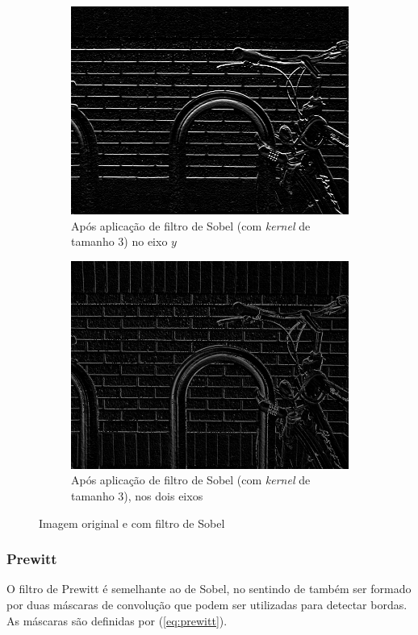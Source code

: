 \documentclass[10pt,a4paper]{article}
\newcommand{\kernel}{\textit{kernel} }
\begin{document}
\begin{figure}[!ht]
\begin{subfigure}[ht]{0.45\textwidth}
        \includegraphics[width=\textwidth]{sobel_y.jpg}
        \caption{\centering Após aplicação de filtro de Sobel (com \kernel de tamanho 3) no eixo $y$}
        \label{fig:sobel_y}
    \end{subfigure}
    \qquad
    \begin{subfigure}[ht]{0.45\textwidth}
        \includegraphics[width=\textwidth]{sobel.jpg}
        \caption{\centering Após aplicação de filtro de Sobel (com \kernel de tamanho 3), nos dois eixos}
        \label{fig:sobel}
    \end{subfigure}
    \caption{Imagem original e com filtro de Sobel}
    \label{fig:sob}
\end{figure}
\subsubsection{Prewitt}
O filtro de Prewitt é semelhante ao de Sobel, no sentindo de também ser formado por duas máscaras de convolução que podem ser utilizadas para detectar bordas. As máscaras são definidas por (\ref{eq:prewitt}).
\end{document}
